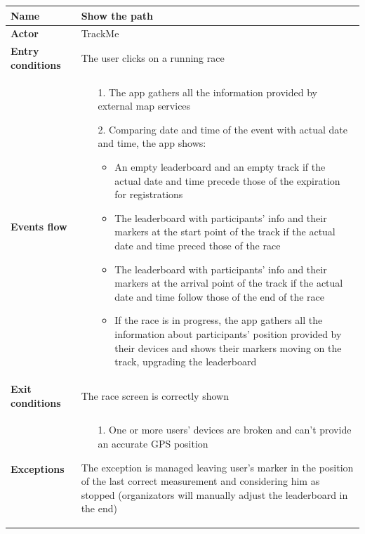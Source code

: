 \begin{table}[]
\begin{adjustbox}{width=\textwidth}
\footnotesize
\begin{tabular}{|p{}|p{}|}
\hline
\textbf{Name}             &  Show the path\\ \hline
\textbf{Actor}            &  TrackMe\\ \hline
\textbf{Entry conditions} &  The user clicks on a running race\\ \hline
\textbf{Events flow}      &
	\begin{itemize}
		\item[1.] The app gathers all the information provided by external map services
		\item[2.] Comparing date and time of the event with actual date and time, the app shows:
		\begin{itemize}
		\item An empty leaderboard and an empty track if the actual date and time precede those of the expiration for registrations
		\item The leaderboard with participants' info and their markers at the start point of the track if the actual date and time preced those of the race
		\item The leaderboard with participants' info and their markers at the arrival point of the track if the actual date and time follow those of the end of the race
		\item If the race is in progress, the app gathers all the information about participants' position provided by their devices and shows their markers moving on the track, upgrading the leaderboard
		\end{itemize}
	\end{itemize}\\ \hline
\textbf{Exit conditions}  &  The race screen is correctly shown\\ \hline
\textbf{Exceptions}       &
	\begin{itemize}
		\item[1.] One or more users' devices are broken and can't provide an accurate GPS position
	\end{itemize}
	The exception is managed leaving user's marker in the position of the last correct measurement and considering him as stopped (organizators will manually adjust the leaderboard in the end)\\ \hline
\end{tabular}
\end{adjustbox}
\end{table}

